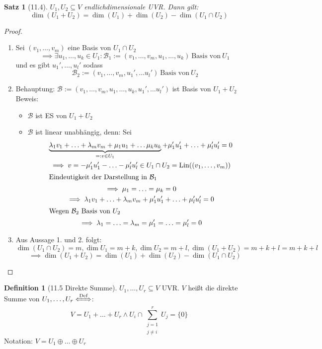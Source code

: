 \documentclass[a4paper]{scrartcl}
\DeclareMathOperator{\Exists}{\exists}
\DeclareMathOperator{\Lin}{Lin}
\theoremstyle{definition}
\newtheorem{defn}{Definition}
\theoremstyle{plain}
\newtheorem{thm}{Satz}
\theoremstyle{plain}
\theoremstyle{remark}
\theoremstyle{remark}
\theoremstyle{remark}
\theoremstyle{remark}
\theoremstyle{remark}
\begin{document}
\begin{thm}[11.4]
$U_1, U_2 \subseteq V$ endlichdimensionale UVR. Dann gilt:
\[\dim(U_1 + U_2) = \dim(U_1) + \dim(U_2) - \dim(U_1 \cap U_2)\]
\end{thm}
\begin{proof}
\begin{enumerate}
\item Sei $(v_1, \ldots, v_m)$ eine Basis von $U_1 \cap U_2$
\[\implies \Exists u_1, \ldots, u_k \in U_1: \mathcal{B}_1 := (v_1, \ldots, v_m, u_1, \ldots, u_k)~\text{Basis von}~U_1\]
und es gibt $u_1', \ldots, u_l'$ sodass
\[\mathcal{B}_2 := (v_1,\ldots, v_m, u_1', \ldots u_l')~\text{Basis von}~U_2\]
\item Behauptung: $\mathcal{B} := (v_1, \ldots, v_m, u_1, \ldots, u_k, u_1', \ldots u_l')$ ist Basis von $U_1 + U_2$
         Beweis:
\begin{itemize}
\item $\mathcal{B}$ ist ES von $U_1 + U_2$
\item $\mathcal{B}$ ist linear unabhängig, denn: Sei
\begin{gather*}
\underbrace{\lambda_1 v_1 + \ldots + \lambda_m v_m + \mu_1 u_1 + \ldots \mu_k u_k}_{=: v\in U_1} + \mu_1' u_1' + \ldots + \mu_l' u_l' = 0 \\
\implies v = -\mu_1' u_1' - \ldots - \mu_l' u_l' \in U_1 \cap U_2 = \Lin((v_1, \ldots, v_m)) \\
\intertext{Eindeutigkeit der Darstellung in $\mathcal{B}_1$}
\implies \mu_1 = \ldots = \mu_k = 0 \\
\implies \lambda_1 v_1 + \ldots + \lambda_m v_m + \mu_1' u_1' + \ldots + \mu_l' u_l' = 0 \\
\intertext{Wegen $\mathcal{B}_2$ Basis von $U_2$}
\implies \lambda_1 = \ldots = \lambda_m = \mu_1' = \ldots = \mu_l' = 0
\end{gather*}
\end{itemize}
\item Aus Aussage 1. und 2. folgt: $\dim(U_1 \cap U_2) = m, \dim U_1 = m + k, \dim U_2 = m + l, \dim(U_1 + U_2) = m + k + l = m + k + l$
         \[\implies \dim(U_1 + U_2) = \dim(U_1) + \dim(U_2) - \dim(U_1 \cap U_2)\]
\end{enumerate}
\end{proof}
\begin{defn}[11.5 Direkte Summe]
$U_1, \ldots, U_r \subseteq V$ UVR. $V$ heißt die direkte Summe von $U_1, \ldots, U_r \xLeftrightarrow{\text{Def}}$:
\[V = U_1 + \ldots + U_r \wedge U_i \cap \sum_{\substack{j = 1\\j\neq i}}^{r} U_j = \{0\}\]
Notation: $V = U_1 \oplus \ldots \oplus U_r$
\end{defn}
\end{document}
